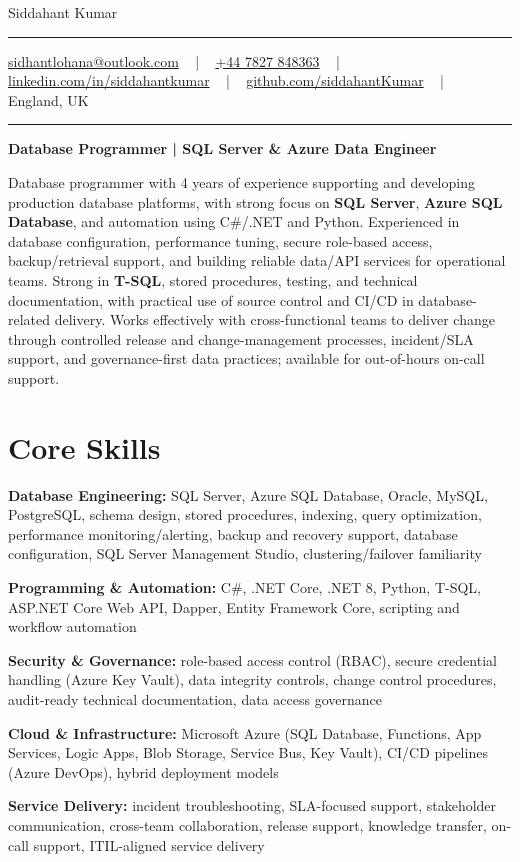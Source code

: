 \documentclass[letterpaper,10pt]{article}
\newcommand{\documentTitle}[2]{
  \begin{center}
    \vspace*{-0.3in}
    {\Huge\color{accentTitle} #1}
    \vspace{8pt}
    {\color{accentLine} \hrule}
    \vspace{2pt}
    \footnotesize{#2}
    \vspace{2pt}
    {\color{accentLine} \hrule}
  \end{center}
}
\newenvironment{resume_list}{
  \vspace{-7pt}
  \begin{itemize}[itemsep=-2px, parsep=1pt, leftmargin=30pt]
}{
  \end{itemize}
}
\begin{document}
\documentTitle{Siddahant Kumar}{
\vspace{0.1cm}
\href{mailto:sidhantlohana@outlook.com}{sidhantlohana@outlook.com} ~ | ~
\href{tel:+447827848363}{+44 7827 848363} ~ | ~
\href{https://www.linkedin.com/in/siddahantkumar/}{linkedin.com/in/siddahantkumar} ~ | ~
\href{https://github.com/siddahantKumar}{github.com/siddahantKumar} ~ | ~
England, UK
}

\begin{center}
\textbf{Database Programmer | SQL Server \& Azure Data Engineer}
\end{center}

Database programmer with 4 years of experience supporting and developing production database platforms, with strong focus on \textbf{SQL Server}, \textbf{Azure SQL Database}, and automation using C\#/.NET and Python. Experienced in database configuration, performance tuning, secure role-based access, backup/retrieval support, and building reliable data/API services for operational teams. Strong in \textbf{T-SQL}, stored procedures, testing, and technical documentation, with practical use of source control and CI/CD in database-related delivery. Works effectively with cross-functional teams to deliver change through controlled release and change-management processes, incident/SLA support, and governance-first data practices; available for out-of-hours on-call support.


\section{Core Skills}

\begin{resume_list}
    \item \textbf{Database Engineering:} SQL Server, Azure SQL Database, Oracle, MySQL, PostgreSQL, schema design, stored procedures, indexing, query optimization, performance monitoring/alerting, backup and recovery support, database configuration, SQL Server Management Studio, clustering/failover familiarity
    \item \textbf{Programming \& Automation:} C\#, .NET Core, .NET 8, Python, T-SQL, ASP.NET Core Web API, Dapper, Entity Framework Core, scripting and workflow automation
    \item \textbf{Security \& Governance:} role-based access control (RBAC), secure credential handling (Azure Key Vault), data integrity controls, change control procedures, audit-ready technical documentation, data access governance
    \item \textbf{Cloud \& Infrastructure:} Microsoft Azure (SQL Database, Functions, App Services, Logic Apps, Blob Storage, Service Bus, Key Vault), CI/CD pipelines (Azure DevOps), hybrid deployment models
    \item \textbf{Service Delivery:} incident troubleshooting, SLA-focused support, stakeholder communication, cross-team collaboration, release support, knowledge transfer, on-call support, ITIL-aligned service delivery
\end{resume_list}
\end{document}
